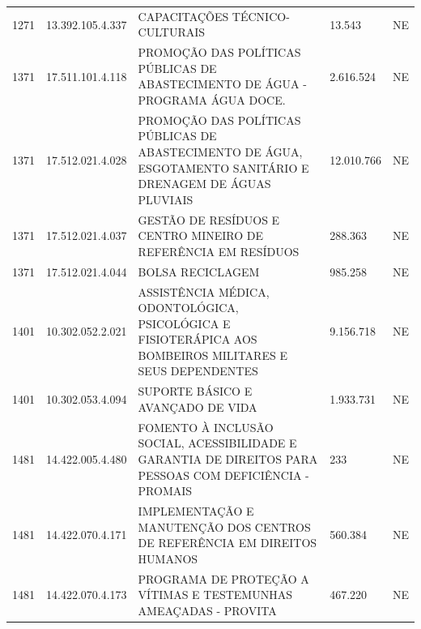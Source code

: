 \documentclass{article}
\begin{document}
\begin{longtable}[c]{m{1cm}|m{2cm}|m{10cm}|m{2cm}|m{1cm}}
\multicolumn{1}{C{1cm}|}{1271} & \multicolumn{1}{C{2cm}|}{13.392.105.4.337} & \multicolumn{1}{L{10cm}|}{CAPACITAÇÕES TÉCNICO-CULTURAIS} & \multicolumn{1}{R{2cm}|}{13.543} & \multicolumn{1}{C{1cm}}{NE} \\
\multicolumn{1}{C{1cm}|}{1371} & \multicolumn{1}{C{2cm}|}{17.511.101.4.118} & \multicolumn{1}{L{10cm}|}{PROMOÇÃO DAS POLÍTICAS PÚBLICAS DE ABASTECIMENTO DE ÁGUA - PROGRAMA ÁGUA DOCE.} & \multicolumn{1}{R{2cm}|}{2.616.524} & \multicolumn{1}{C{1cm}}{NE} \\
\multicolumn{1}{C{1cm}|}{1371} & \multicolumn{1}{C{2cm}|}{17.512.021.4.028} & \multicolumn{1}{L{10cm}|}{PROMOÇÃO DAS POLÍTICAS PÚBLICAS DE ABASTECIMENTO DE ÁGUA, ESGOTAMENTO SANITÁRIO E DRENAGEM DE ÁGUAS PLUVIAIS} & \multicolumn{1}{R{2cm}|}{12.010.766} & \multicolumn{1}{C{1cm}}{NE} \\
\multicolumn{1}{C{1cm}|}{1371} & \multicolumn{1}{C{2cm}|}{17.512.021.4.037} & \multicolumn{1}{L{10cm}|}{GESTÃO DE RESÍDUOS E CENTRO MINEIRO DE REFERÊNCIA EM RESÍDUOS} & \multicolumn{1}{R{2cm}|}{288.363} & \multicolumn{1}{C{1cm}}{NE} \\
\multicolumn{1}{C{1cm}|}{1371} & \multicolumn{1}{C{2cm}|}{17.512.021.4.044} & \multicolumn{1}{L{10cm}|}{BOLSA RECICLAGEM} & \multicolumn{1}{R{2cm}|}{985.258} & \multicolumn{1}{C{1cm}}{NE} \\
\multicolumn{1}{C{1cm}|}{1401} & \multicolumn{1}{C{2cm}|}{10.302.052.2.021} & \multicolumn{1}{L{10cm}|}{ASSISTÊNCIA MÉDICA, ODONTOLÓGICA, PSICOLÓGICA E FISIOTERÁPICA AOS BOMBEIROS MILITARES E SEUS DEPENDENTES} & \multicolumn{1}{R{2cm}|}{9.156.718} & \multicolumn{1}{C{1cm}}{NE} \\
\multicolumn{1}{C{1cm}|}{1401} & \multicolumn{1}{C{2cm}|}{10.302.053.4.094} & \multicolumn{1}{L{10cm}|}{SUPORTE BÁSICO E AVANÇADO DE VIDA} & \multicolumn{1}{R{2cm}|}{1.933.731} & \multicolumn{1}{C{1cm}}{NE} \\
\multicolumn{1}{C{1cm}|}{1481} & \multicolumn{1}{C{2cm}|}{14.422.005.4.480} & \multicolumn{1}{L{10cm}|}{FOMENTO À INCLUSÃO SOCIAL, ACESSIBILIDADE E GARANTIA DE DIREITOS PARA PESSOAS COM DEFICIÊNCIA - PROMAIS} & \multicolumn{1}{R{2cm}|}{233} & \multicolumn{1}{C{1cm}}{NE} \\
\multicolumn{1}{C{1cm}|}{1481} & \multicolumn{1}{C{2cm}|}{14.422.070.4.171} & \multicolumn{1}{L{10cm}|}{IMPLEMENTAÇÃO E MANUTENÇÃO DOS CENTROS DE REFERÊNCIA EM DIREITOS HUMANOS} & \multicolumn{1}{R{2cm}|}{560.384} & \multicolumn{1}{C{1cm}}{NE} \\
\multicolumn{1}{C{1cm}|}{1481} & \multicolumn{1}{C{2cm}|}{14.422.070.4.173} & \multicolumn{1}{L{10cm}|}{PROGRAMA DE PROTEÇÃO A VÍTIMAS E TESTEMUNHAS AMEAÇADAS - PROVITA} & \multicolumn{1}{R{2cm}|}{467.220} & \multicolumn{1}{C{1cm}}{NE} \\

\end{longtable}
\end{document}
